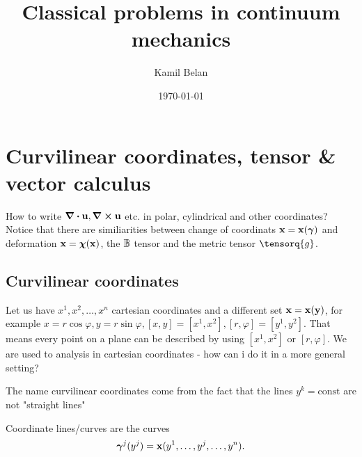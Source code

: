 \documentclass[reqno, a4paper]{article}
\begin{document}
\title{Classical problems in continuum mechanics}

\date{\today}

\author{Kamil Belan}



\begin{comment}
\begin{abstract}
  Here comes the abstract.
\end{abstract}
\end{comment}

\maketitle

\section{Curvilinear coordinates, tensor \& vector calculus}
\label{sec:curvilinear_coords}
How to write $\divergence{\vb{u}}, \curl{\vb{u}}$ etc. in polar, cylindrical and other coordinates? Notice that there are similiarities between change of coordinats $\vb{x} = \vb{x}(\vb*{\gamma})$ and deformation $\vb{x}=\vb*{\chi}(\vb{x})$, the $\mathbb{B}$ tensor and the metric tensor $\tensorq{g}$.

\subsection{Curvilinear coordinates}
\label{sec:curvi}
Let us have $x^1,x^2,\dots,x^n$ cartesian coordinates and a different set $\vb{x}=\vb{x}(\vb{y})$, for example $x=r \cos \varphi, y=r \sin \varphi, [x,y]=[x^1,x^2], [r,\varphi] = [y^1,y^2]$. That means every point on a plane can be described by using $[x^1,x^2]$ or $[r,\varphi]$. We are used to analysis in cartesian coordinates - how can i do it in a more general setting?

\begin{remark}
	The name curvilinear coordinates come from the fact that the lines $y^k=\text{const}$ are not "straight lines"
\end{remark}

\begin{definition}
	Coordinate lines/curves are the curves
	\[
		\vb*{\gamma}^j(y^j) = \vb{x}(y^1,\dots,y^j,\dots,y^n).
	\]
	
\end{definition}
\end{document}
